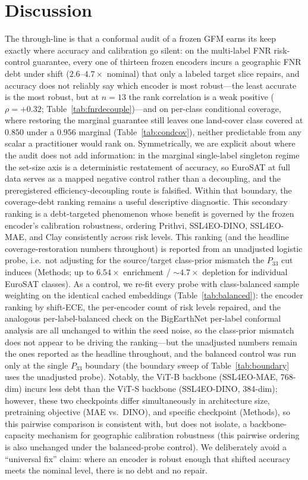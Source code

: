 \documentclass[journal]{IEEEtran}
\renewcommand{\_}{\textunderscore\allowbreak}
\begin{document}
\section{Discussion}\label{sec:discussion}
The through-line is that a conformal audit of a frozen GFM earns its keep exactly where accuracy and
calibration go silent: on the multi-label FNR risk-control guarantee, every one of thirteen frozen
encoders incurs a geographic FNR debt under shift ($2.6$--$4.7\times$ nominal) that only a labeled target
slice repairs, and accuracy does not reliably say which encoder is most robust---the least accurate is the
most robust, but at $n{=}13$ the rank correlation is a weak positive ($\rho{=}+0.32$; Table~\ref{tab:fnrdecouple})---and on
per-class conditional coverage, where restoring the marginal guarantee still leaves one land-cover class
covered at $0.850$ under a $0.956$ marginal (Table~\ref{tab:condcov}), neither predictable from
any scalar a practitioner would rank on. Symmetrically, we are explicit about where the audit does
not add information: in the marginal single-label singleton regime the set-size axis is a
deterministic restatement of accuracy, so EuroSAT at full data serves as a mapped negative control rather
than a decoupling, and the preregistered efficiency-decoupling route is falsified. Within that boundary,
the coverage-debt ranking remains a useful descriptive diagnostic. This secondary
ranking is a debt-targeted phenomenon whose benefit is governed by the frozen encoder's calibration
robustness, ordering Prithvi, SSL4EO-DINO, SSL4EO-MAE, and Clay consistently across risk levels. This ranking
(and the headline coverage-restoration numbers throughout) is
reported from an unadjusted logistic probe, i.e.\ not adjusting for the source/target class-prior
mismatch the $P_{33}$ cut induces (Methods; up to $6.54\times$ enrichment / $\sim\!4.7\times$ depletion for
individual EuroSAT classes). As a control, we re-fit every probe with class-balanced sample weighting on
the identical cached embeddings (Table~\ref{tab:balanced}): the encoder ranking by shift-ECE, the
per-encoder count of risk levels repaired, and the analogous per-label-balanced check on the BigEarthNet
per-label conformal analysis are all unchanged to within the seed noise, so the class-prior mismatch does not
appear to be driving the ranking---but the unadjusted numbers remain the ones reported as the headline
throughout, and the balanced control was run only at the single $P_{33}$ boundary (the boundary sweep of
Table~\ref{tab:boundary} uses the unadjusted probe). Notably, the ViT-B backbone (SSL4EO-MAE, 768-dim) incurs less debt than
the ViT-S backbone (SSL4EO-DINO, 384-dim); however, these two checkpoints differ simultaneously in
architecture size, pretraining objective (MAE vs.\ DINO), and specific checkpoint (Methods), so this
pairwise comparison is consistent with, but does not isolate, a backbone-capacity mechanism for geographic
calibration robustness (this pairwise ordering is also unchanged under the balanced-probe control). We
deliberately avoid a ``universal fix'' claim: where an encoder is robust
enough that shifted accuracy meets the nominal level, there is no debt and no repair.
\end{document}
